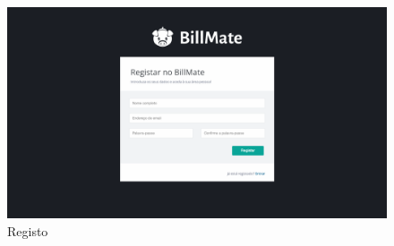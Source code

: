 \begin{referenciaswww}

\newpage


\begin{figure}[ht]
{
\includegraphics[width=.5\textwidth]{images/andre/registo}
\caption{Registo}
}
\end{figure}


\end{referenciaswww}
